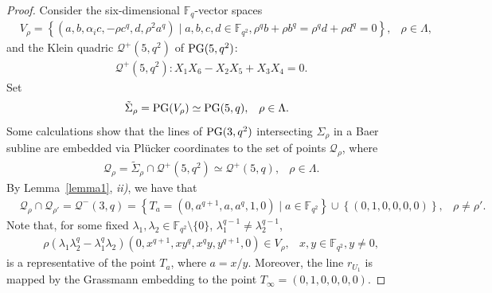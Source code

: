 \documentclass[11pt]{article}
\theoremstyle{definition}
\numberwithin{equation}{section}
\def\cQ{\mathcal Q}
\def\PG{{\rm PG}}
\def\F{{\mathbb F}}
\begin{document}
\begin{proof}
Consider the six-dimensional $\F_q$-vector spaces
\begin{align*}
& V_{\rho} =  \left\{(a,b, \alpha_i c, - \rho c^q, d, \rho^2 a^q) \mid a,b,c,d \in \F_{q^2}, \rho^q b + \rho b^q = \rho^q d + \rho d^q = 0 \right\}, & \rho \in \Lambda,  
\end{align*}
and the Klein quadric $\cQ^+(5, q^2)$ of $\PG(5, q^2)$:
\begin{align*}
& \cQ^+(5, q^2): X_1 X_6 - X_2 X_5 + X_3 X_4 = 0.  
\end{align*}
Set 
\begin{align*}
& \tilde{\Sigma}_{\rho} = \PG(V_{\rho}) \simeq \PG(5, q), & \rho \in \Lambda.
\end{align*}
Some calculations show that the lines of $\PG(3, q^2)$ intersecting $\Sigma_{\rho}$ in a Baer subline are embedded via Pl\"ucker coordinates to the set of points $\cQ_{\rho}$, where
\begin{align*}
&\cQ_{\rho} = \tilde{\Sigma}_{\rho} \cap \cQ^+(5, q^2) \simeq \cQ^+(5, q), & \rho \in \Lambda. 
\end{align*}
By Lemma~\ref{lemma1}, {\em ii)}, we have that 
\begin{align*}
& \cQ_{\rho} \cap \cQ_{\rho'} = \cQ^-(3, q) = \left\{T_a = \left( 0, a^{q+1}, a, a^q, 1, 0 \right) \mid a \in \F_{q^2} \right\} \cup \left\{(0,1,0,0,0,0)\right\}, & \rho \ne \rho'.
\end{align*}
Note that, for some fixed $\lambda_1, \lambda_2 \in \F_{q^2} \setminus \{0\}$, $\lambda_1^{q-1} \ne \lambda_2^{q-1}$,  
\begin{align*}
& \rho \left( \lambda_1 \lambda_2^q - \lambda_1^q \lambda_2 \right) \left( 0,  x^{q+1}, x y^q, x^q y, y^{q+1}, 0 \right) \in V_{\rho}, & x,y \in \F_{q^2}, y \ne 0,
\end{align*}
is a representative of the point $T_a$, where $a = x/y$.
Moreover, the line $r_{U_1}$ is mapped by the Grassmann embedding to the point $T_\infty = (0,1,0,0,0,0)$. 


\end{proof}
\end{document}
